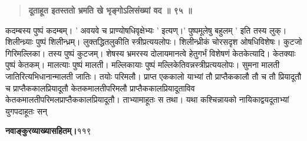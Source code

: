 \documentclass[11pt, openany]{book}
\begin{document}
\begin{sloppypar}
\begin{quote}
\hspace{1in}\textbf{दूताहूत इतस्ततो भ्रमति खे भृङ्गोऽलिसंख्यां वद ॥ ९५ ॥}
\end{quote}

\hangindent=0.2in \hspace{0.2in}कदम्बस्य पुष्पं कदम्बम्। ' अवयवे च प्राण्योषधिवृक्षेभ्यः ' इत्यण्।' पुष्पमूलेषु बहुलम् ' इति तस्य लुक्। शिलीन्ध्र्याः पुष्पं शिलीन्ध्रम्। लुक्तद्धितलुकीति स्त्रीप्रत्ययलोपः। शिलीन्ध्रीकं चोरसदृश ओषधिविशेषः। कुटजो गिरिमल्लिका। तस्य पुष्पं कुटजम्। शेषस्य भ्रमरस्य दोलायमानत्वे हेतुगर्भं विशेषणं केतकेत्यादि। केतक्याः पुष्पं केतकम्। मालत्याः पुष्पं मालती। मल्लिकायाः पुष्पं मल्लिकेतिवन्नस्त्रीप्रत्ययलोपः। सुमना मालती जातिरित्यभिधानान्मालती जातिः। तयोः परिमलौ। प्राप्त एककालो याभ्यां तौ प्राप्तैककालौ तौ च तौ प्रियादूतौ च प्राप्तैककालप्रियादूतौ केतकमालतीपरिमलौ प्राप्तैककालप्रियादूताविव केतकमालतीपरिमलप्राप्तैककालप्रियादूतौ। ताभ्यामाहूतः स तथा। यथा कश्चिन्नायको नायिकाद्वयदूताभ्यां युगपदाहूतः सन्
\end{sloppypar}
\thispagestyle{empty}
\newpage

\onehalfspacing
\hspace{2in}\textbf{नवाङ्कुरव्याख्यासहितम्।}\hspace{2in}११९

\vspace{5mm}
\end{document}
